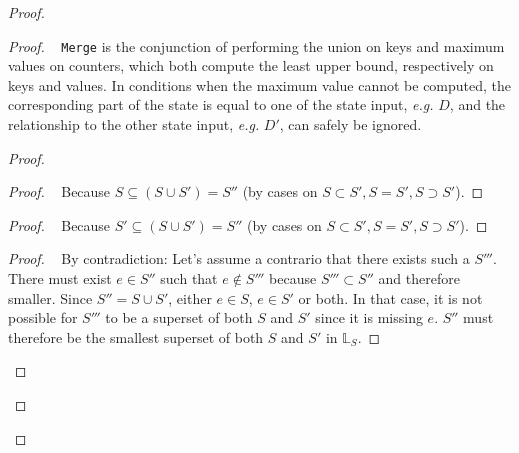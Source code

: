 \documentclass[11pt, oneside]{article}   	%
\begin{document}
\begin{proof}
	\begin{proof}
		\pfsketch~ \texttt{Merge} is the conjunction of performing the union on keys and maximum values on counters, which both compute the least upper bound, respectively on keys and values. In conditions when the maximum value cannot be computed, the corresponding part of the state is equal to one of the state input, \textit{e.g.} $D$, and the relationship to the other state input, \textit{e.g.} $D'$, can safely be ignored.
		\begin{proof}
			\begin{proof}
				\pf~ Because $S \subseteq (S \cup S') = S''$ (by cases on $S \subset S', S=S', S \supset S'$).
			\end{proof}
			
			\begin{proof}
				\pf~ Because $S' \subseteq (S \cup S') = S''$ (by cases on $S \subset S', S=S', S \supset S'$).
			\end{proof}
			
			\begin{proof}
				\pf~ By contradiction: Let's assume a contrario that there exists such a $S'''$. There must exist $e \in S''$ such that $e \notin S'''$ because $S''' \subset S''$ and therefore smaller. Since $S'' = S \cup S'$, either $e \in S$, $e \in S'$ or both. In that case, it is not possible for $S'''$ to be a superset of both $S$ and $S'$ since it is missing $e$. $S''$ must therefore be the smallest superset of both $S$ and $S'$ in $\mathds{L}_S$.
			\end{proof}


\end{proof}
\end{proof}
\end{proof}
\end{document}
